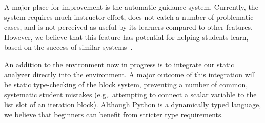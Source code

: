 \documentclass[10pt,journal,compsoc]{IEEEtran}
\begin{document}
A major place for improvement is the automatic guidance system.
Currently, the system requires much instructor effort, does not catch a number of problematic cases, and is not perceived as useful by its learners compared to other features.
However, we believe that this feature has potential for helping students learn, based on the success of similar systems~\cite{price2017isnap}.


An addition to the environment now in progress is to integrate our static analyzer directly into the environment.
A major outcome of this integration will be static type-checking of the block system, preventing a number of common, systematic student mistakes (e.g,. attempting to connect a scalar variable to the list slot of an iteration block).
Although Python is a dynamically typed language, we believe that beginners can benefit from stricter type requirements.

\end{document}
